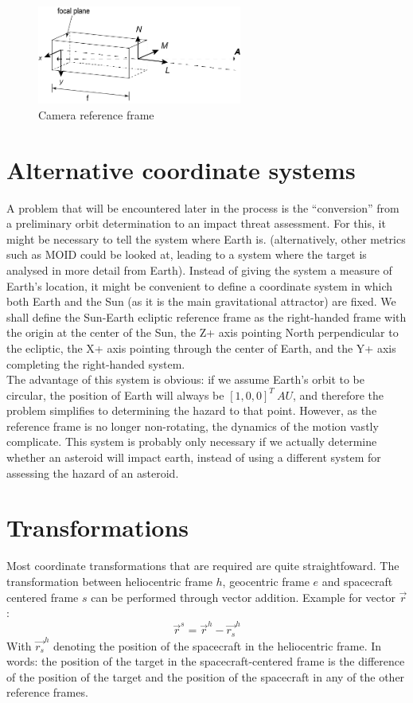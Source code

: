 \documentclass[a4paper,10pt]{article}
\begin{document}
\begin{figure}[htbp]
 \centering
 \includegraphics[width=0.6\textwidth]{cameracoordinates.png}
 \caption{Camera reference frame}
 \label{fig:cameracoordinates}
\end{figure}

\section{Alternative coordinate systems}
A problem that will be encountered later in the process is the ``conversion'' from a preliminary orbit determination to an impact threat assessment. For this, it might be necessary to tell the system where Earth is. (alternatively, other metrics such as MOID could be looked at, leading to a system where the target is analysed in more detail from Earth). Instead of giving the system a measure of Earth's location, it might be convenient to define a coordinate system in which both Earth and the Sun (as it is the main gravitational attractor) are fixed. We shall define the Sun-Earth ecliptic reference frame as the right-handed frame with the origin at the center of the Sun, the Z+ axis pointing North perpendicular to the ecliptic, the X+ axis pointing through the center of Earth, and the Y+ axis completing the right-handed system. \\

The advantage of this system is obvious: if we assume Earth's orbit to be circular, the position of Earth will always be $[1, 0, 0]^T~AU$, and therefore the problem simplifies to determining the hazard to that point. However, as the reference frame is no longer non-rotating, the dynamics of the motion vastly complicate. This system is probably only necessary if we actually determine whether an asteroid will impact earth, instead of using a different system for assessing the hazard of an asteroid.

\section{Transformations}

Most coordinate transformations that are required are quite straightfoward. The transformation between heliocentric frame $h$, geocentric frame $e$ and spacecraft centered frame $s$ can be performed through vector addition. Example for vector $\vec{r}$:
\begin{equation}
 \vec{r}^s = \vec{r}^h - \vec{r_s}^h
\end{equation}
With $\vec{r_s}^h$ denoting the position of the spacecraft in the heliocentric frame. In words: the position of the target in the spacecraft-centered frame is the difference of the position of the target and the position of the spacecraft in any of the other reference frames. \\
\end{document}
